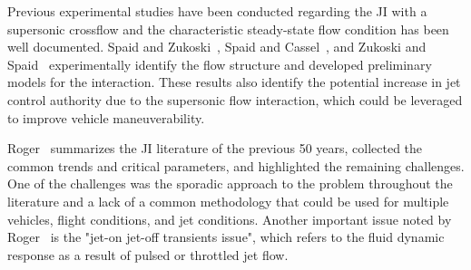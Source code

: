 \documentclass[12pt]{article}
\begin{document}



Previous experimental studies have been conducted regarding the JI with a supersonic crossflow and the characteristic steady-state flow condition has been well documented. Spaid and Zukoski~\cite{spaid1968study}, Spaid and Cassel~\cite{spaid1973aerodynamic}, and Zukoski and Spaid~\cite{zukoski1964secondary} experimentally identify the flow structure and developed preliminary models for the interaction. These results also identify the potential increase in jet control authority due to the supersonic flow interaction, which could be leveraged to improve vehicle maneuverability.

Roger~\cite{roger1999aerodynamics} summarizes the JI literature of the previous 50 years, collected the common trends and critical parameters, and highlighted the remaining challenges. One
of the challenges was the sporadic approach to the problem throughout the literature
and a lack of a common methodology that could be used for multiple vehicles, flight
conditions, and jet conditions. Another important issue noted by Roger~\cite{roger1999aerodynamics} is the "jet-on jet-off transients issue", which refers to the fluid dynamic response as a result of pulsed or throttled jet flow. %
\end{document}
